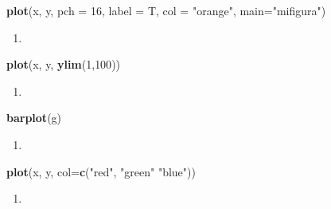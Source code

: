 \documentclass[]{book}
\newenvironment{Shaded}{\begin{snugshade}}{\end{snugshade}}
\newcommand{\DataTypeTok}[1]{\textcolor[rgb]{0.13,0.29,0.53}{#1}}
\newcommand{\DecValTok}[1]{\textcolor[rgb]{0.00,0.00,0.81}{#1}}
\newcommand{\KeywordTok}[1]{\textcolor[rgb]{0.13,0.29,0.53}{\textbf{#1}}}
\newcommand{\NormalTok}[1]{#1}
\newcommand{\StringTok}[1]{\textcolor[rgb]{0.31,0.60,0.02}{#1}}
\begin{document}
\begin{Shaded}
\begin{Highlighting}[]
\KeywordTok{plot}\NormalTok{(x, y, }\DataTypeTok{pch =} \DecValTok{16}\NormalTok{, }\DataTypeTok{label =}\NormalTok{ T, }\DataTypeTok{col =} \StringTok{"orange"}\NormalTok{, }\DataTypeTok{main=}\StringTok{"mifigura"}\NormalTok{)}
\end{Highlighting}
\end{Shaded}

\begin{enumerate}
\def\labelenumi{\arabic{enumi}.}
\setcounter{enumi}{3}
\item
\end{enumerate}

\begin{Shaded}
\begin{Highlighting}[]
\KeywordTok{plot}\NormalTok{(x, y, }\KeywordTok{ylim}\NormalTok{(}\DecValTok{1}\NormalTok{,}\DecValTok{100}\NormalTok{))}
\end{Highlighting}
\end{Shaded}

\begin{enumerate}
\def\labelenumi{\arabic{enumi}.}
\setcounter{enumi}{4}
\item
\end{enumerate}

\begin{Shaded}
\begin{Highlighting}[]
\KeywordTok{barplot}\NormalTok{(g)}
\end{Highlighting}
\end{Shaded}

\begin{enumerate}
\def\labelenumi{\arabic{enumi}.}
\setcounter{enumi}{5}
\item
\end{enumerate}

\begin{Shaded}
\begin{Highlighting}[]
\KeywordTok{plot}\NormalTok{(x, y, }\DataTypeTok{col=}\KeywordTok{c}\NormalTok{(}\StringTok{"red"}\NormalTok{, }\StringTok{"green"} \StringTok{"blue"}\NormalTok{))}
\end{Highlighting}
\end{Shaded}

\begin{enumerate}
\def\labelenumi{\arabic{enumi}.}
\setcounter{enumi}{6}
\item
\end{enumerate}
\end{document}
